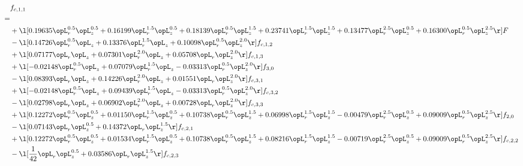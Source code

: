 \begin{alignat}{2} 
\label{eq:f_11_2} 
& f_{c,1,1} \nonumber \\ 
 = \\ 
& + \l[  0.19635 \opL_r^{0.5} \opL_z^{0.5} +  0.16199 \opL_r^{1.5} \opL_z^{0.5} +  0.18139 \opL_r^{0.5} \opL_z^{1.5} +  0.23741 \opL_r^{1.5} \opL_z^{1.5} +  0.13477 \opL_r^{2.5} \opL_z^{0.5} +  0.16300 \opL_r^{0.5} \opL_z^{2.5}  \r] F \nonumber \\ 
& - \l[  0.14726 \opL_r^{0.5} \opL_z +  0.13376 \opL_r^{1.5} \opL_z +  0.10098 \opL_r^{0.5} \opL_z^{2.0}  \r] f_{c,1,2} \nonumber \\ 
& + \l[  0.07177 \opL_r \opL_z +  0.07301 \opL_r^{2.0} \opL_z +  0.05708 \opL_r \opL_z^{2.0}  \r] f_{c,1,3} \nonumber \\ 
& + \l[  -0.02148 \opL_r^{0.5} \opL_z +  0.07079 \opL_r^{1.5} \opL_z   -0.03313 \opL_r^{0.5} \opL_z^{2.0}  \r] f_{3,0} \nonumber \\ 
& - \l[  0.08393 \opL_r \opL_z +  0.14226 \opL_r^{2.0} \opL_z +  0.01551 \opL_r \opL_z^{2.0}  \r] f_{c,3,1} \nonumber \\ 
& + \l[  -0.02148 \opL_r^{0.5} \opL_z +  0.09439 \opL_r^{1.5} \opL_z   -0.03313 \opL_r^{0.5} \opL_z^{2.0}  \r] f_{c,3,2} \nonumber \\ 
& - \l[  0.02798 \opL_r \opL_z +  0.06902 \opL_r^{2.0} \opL_z +  0.00728 \opL_r \opL_z^{2.0}  \r] f_{c,3,3} \nonumber \\ 
& + \l[  0.12272 \opL_r^{0.5} \opL_z^{0.5} +  0.01150 \opL_r^{1.5} \opL_z^{0.5} +  0.10738 \opL_r^{0.5} \opL_z^{1.5} +  0.06998 \opL_r^{1.5} \opL_z^{1.5}   -0.00479 \opL_r^{2.5} \opL_z^{0.5} +  0.09009 \opL_r^{0.5} \opL_z^{2.5}  \r] f_{2,0} \nonumber \\ 
& - \l[  0.07143 \opL_r \opL_z^{0.5} +  0.14372 \opL_r \opL_z^{1.5}  \r] f_{c,2,1} \nonumber \\ 
& + \l[  0.12272 \opL_r^{0.5} \opL_z^{0.5} +  0.01534 \opL_r^{1.5} \opL_z^{0.5} +  0.10738 \opL_r^{0.5} \opL_z^{1.5} +  0.08216 \opL_r^{1.5} \opL_z^{1.5}   -0.00719 \opL_r^{2.5} \opL_z^{0.5} +  0.09009 \opL_r^{0.5} \opL_z^{2.5}  \r] f_{c,2,2} \nonumber \\ 
& - \l[ \frac{1}{42} \opL_r \opL_z^{0.5} +  0.03586 \opL_r \opL_z^{1.5}  \r] f_{c,2,3} \nonumber \\ 
\end{alignat} 


